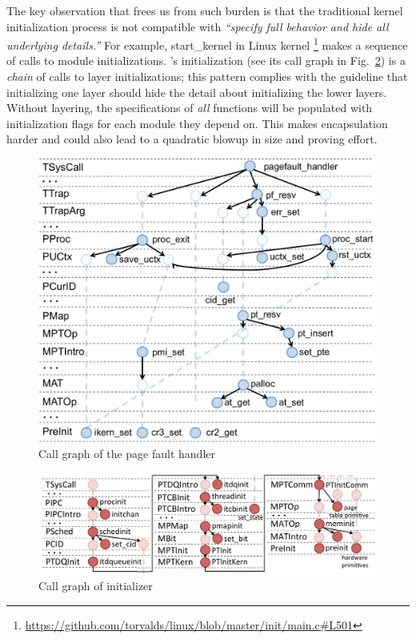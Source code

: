 {The key observation that frees us from such burden is that the traditional
kernel initialization process is not compatible with
\emph{``specify full behavior and hide all underlying details.''}
For example, \textsf{start\_kernel} in Linux
kernel \footnote{\url{https://github.com/torvalds/linux/blob/master/init/main.c\#L501}}
makes a sequence of calls to module initializations.  \mCTOSbase's
initialization (see its call graph in
Fig.\ \ref{fig:mcertikos-init-call-graph}) is a \emph{chain} of calls
to layer initializations; this pattern complies with the guideline that 
initializing one layer should
hide the detail about initializing the lower layers.
Without layering, the specifications of \emph{all} functions will be populated
with initialization flags for each module they depend on. This
makes encapsulation harder and could also lead to
a quadratic blowup in size and proving effort.

\begin{figure}
\center
\includegraphics[scale=0.3]{figs/pagefault2}
\caption{Call graph of the page fault handler}
\label{fig:pagefault-call-graph}
\end{figure}

\begin{figure}
\center
\includegraphics[scale=0.3]{figs/initialization}
\caption{Call graph of \mCTOSbase{} initializer}
\label{fig:mcertikos-init-call-graph}
\end{figure}

}
